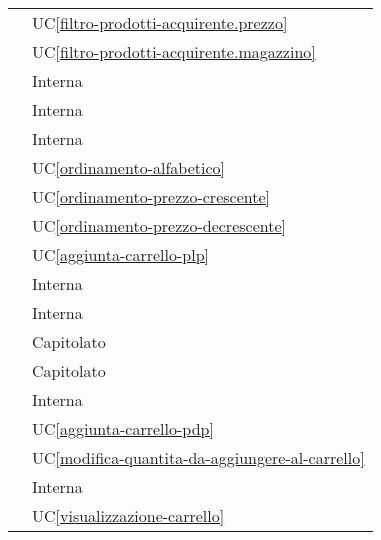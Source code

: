 \begin{longtable}{C{6cm} C{6cm}}
     & UC\ref{filtro-prodotti-acquirente.prezzo} \\

     & UC\ref{filtro-prodotti-acquirente.magazzino} \\

     & Interna \\

     & Interna \\

     & Interna \\

     & UC\ref{ordinamento-alfabetico} \\

     & UC\ref{ordinamento-prezzo-crescente} \\

     & UC\ref{ordinamento-prezzo-decrescente} \\

     & UC\ref{aggiunta-carrello-plp} \\

     & Interna \\

     & Interna \\

     & Capitolato \\

     & Capitolato \\

     & Interna \\

     & UC\ref{aggiunta-carrello-pdp} \\

     & UC\ref{modifica-quantita-da-aggiungere-al-carrello} \\

     & Interna \\

     & UC\ref{visualizzazione-carrello} \\


\end{longtable}
